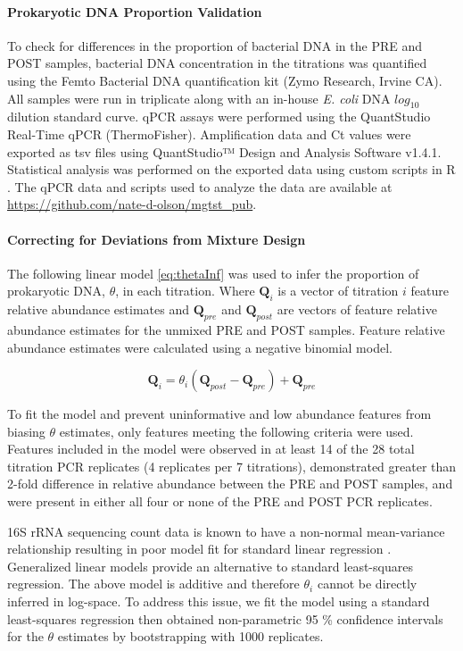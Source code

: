 \documentclass[linenumbers]{bmcart}
\begin{document}
\paragraph*{Prokaryotic DNA Proportion Validation}
To check for differences in the proportion of bacterial DNA in the PRE
and POST samples, bacterial DNA concentration in the titrations was quantified
using the Femto Bacterial DNA quantification kit (Zymo Research, Irvine
CA). All samples were run in triplicate along with an in-house \emph{E.
coli} DNA \(log_{10}\) dilution standard curve. qPCR assays were
performed using the QuantStudio Real-Time qPCR (ThermoFisher).
Amplification data and Ct values were exported as tsv files using
QuantStudio™ Design and Analysis Software v1.4.1. Statistical analysis
was performed on the exported data using custom scripts in R \cite{R}.
The qPCR data and scripts used to analyze the data are available at
\url{https://github.com/nate-d-olson/mgtst_pub}.

\paragraph*{Correcting for Deviations from Mixture Design}
The following linear model \eqref{eq:thetaInf} was used to infer the
proportion of prokaryotic DNA, \(\theta\), in each titration. Where
\(\textbf{Q}_{i}\) is a vector of titration \(i\) feature relative
abundance estimates and \(\textbf{Q}_{pre}\) and \(\textbf{Q}_{post}\)
are vectors of feature relative abundance estimates for the unmixed PRE
and POST samples. Feature relative abundance estimates were calculated
using a negative binomial model.

\begin{equation}
  \textbf{Q}_{i} = \theta_i (\textbf{Q}_{post} -\textbf{Q}_{pre}) + \textbf{Q}_{pre}
  \label{eq:thetaInf}
\end{equation}

To fit the model and prevent uninformative and low abundance features
from biasing \(\theta\) estimates, only features meeting the following
criteria were used. Features included in the model were observed in at
least 14 of the 28 total titration PCR replicates (4 replicates per 7
titrations), demonstrated greater than 2-fold difference in relative
abundance between the PRE and POST samples, and were present in either
all four or none of the PRE and POST PCR replicates.

16S rRNA sequencing count data is known to have a non-normal
mean-variance relationship resulting in poor model fit for standard
linear regression \cite{McMurdie2014}. Generalized linear models
provide an alternative to standard least-squares regression. The above
model is additive and therefore \(\theta_i\) cannot be directly inferred
in log-space. To address this issue, we fit the model using a standard
least-squares regression then obtained non-parametric 95 \% confidence
intervals for the \(\theta\) estimates by bootstrapping with 1000
replicates.
\end{document}
